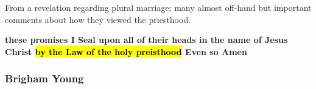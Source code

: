 \begin{compactdesc}
			\item[{\hyperref[EMS-1842-JS-27-JUL-1842]{27 July 1842}}] \phantom{.}
				\begin{compactitem}
					\item From a revelation regarding plural marriage; many almost off-hand but important comments about how they viewed the priesthood.
				\end{compactitem}
			\item[{\hyperref[EMS-1843-JS-23-MAR-1843-SAW]{23 March 1843}}] \textbf{these promises I Seal upon all of their heads in the name of Jesus Christ \hl{by the Law of the holy preisthood} Even so Amen}
		\end{compactdesc}
	
	\subsubsection{Brigham Young} %
		\label{PRIESTHOOD-BY}
	
